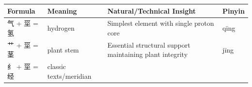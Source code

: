 \begin{longtable}[]{@{}llll@{}}
\toprule
\begin{minipage}[b]{0.15\columnwidth}\raggedright
Formula\strut
\end{minipage} & \begin{minipage}[b]{0.15\columnwidth}\raggedright
Meaning\strut
\end{minipage} & \begin{minipage}[b]{0.43\columnwidth}\raggedright
Natural/Technical Insight\strut
\end{minipage} & \begin{minipage}[b]{0.15\columnwidth}\raggedright
Pinyin\strut
\end{minipage}\tabularnewline
\midrule
\endhead
\begin{minipage}[t]{0.15\columnwidth}\raggedright
气 + 坙 = 氢\strut
\end{minipage} & \begin{minipage}[t]{0.15\columnwidth}\raggedright
hydrogen\strut
\end{minipage} & \begin{minipage}[t]{0.43\columnwidth}\raggedright
Simplest element with single proton core\strut
\end{minipage} & \begin{minipage}[t]{0.15\columnwidth}\raggedright
qīng\strut
\end{minipage}\tabularnewline
\begin{minipage}[t]{0.15\columnwidth}\raggedright
艹 + 坙 = 茎\strut
\end{minipage} & \begin{minipage}[t]{0.15\columnwidth}\raggedright
plant stem\strut
\end{minipage} & \begin{minipage}[t]{0.43\columnwidth}\raggedright
Essential structural support maintaining plant integrity\strut
\end{minipage} & \begin{minipage}[t]{0.15\columnwidth}\raggedright
jīng\strut
\end{minipage}\tabularnewline
\begin{minipage}[t]{0.15\columnwidth}\raggedright
纟 + 坙 = 经\strut
\end{minipage} & \begin{minipage}[t]{0.15\columnwidth}\raggedright
classic texts/meridian\strut
\end{minipage} & \begin{minipage}[t]{0.43\columnwidth}\raggedright

\end{minipage}
\end{longtable}
